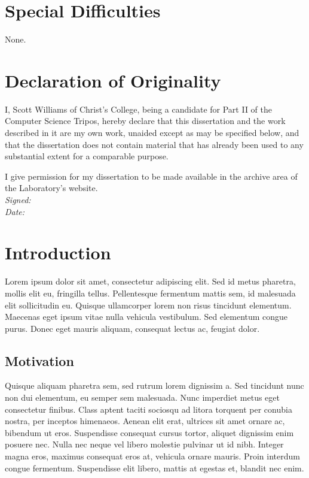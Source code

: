 \documentclass[paper=a4, fontsize=11pt,twoside]{scrartcl}    %
\begin{document}
\section*{Special Difficulties}
None.

\pagebreak
\section*{Declaration of Originality}
I, Scott Williams of Christ's College, being a candidate for Part II of the Computer
Science Tripos, hereby declare that this dissertation and the work described
in it are my own work, unaided except as may be specified below, and that
the dissertation does not contain material that has already been used to any
substantial extent for a comparable purpose.

I give permission for my dissertation to be made available in the archive
area of the Laboratory's website.\\[20pt]
\textit{Signed:}\\[20pt]
\textit{Date:}
\clearpage

\tableofcontents

\pagebreak
{} 
\section{Introduction}
Lorem ipsum dolor sit amet, consectetur adipiscing elit. Sed id metus pharetra, mollis elit eu, fringilla tellus. Pellentesque fermentum mattis sem, id malesuada elit sollicitudin eu. Quisque ullamcorper lorem non risus tincidunt elementum. Maecenas eget ipsum vitae nulla vehicula vestibulum. Sed elementum congue purus. Donec eget mauris aliquam, consequat lectus ac, feugiat dolor.
\subsection{Motivation}
Quisque aliquam pharetra sem, sed rutrum lorem dignissim a. Sed tincidunt nunc non dui elementum, eu semper sem malesuada. Nunc imperdiet metus eget consectetur finibus. Class aptent taciti sociosqu ad litora torquent per conubia nostra, per inceptos himenaeos. Aenean elit erat, ultrices sit amet ornare ac, bibendum ut eros. Suspendisse consequat cursus tortor, aliquet dignissim enim posuere nec. Nulla nec neque vel libero molestie pulvinar ut id nibh. Integer magna eros, maximus consequat eros at, vehicula ornare mauris. Proin interdum congue fermentum. Suspendisse elit libero, mattis at egestas et, blandit nec enim. 
\end{document}
